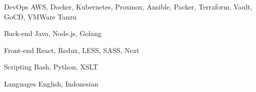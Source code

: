 

\begin{cvskills}

  \cvskill
    {DevOps} %
    {AWS, Docker, Kubernetes, Proxmox, Ansible, Packer, Terraform, Vault, GoCD, VMWare Tanzu} %

  \cvskill
    {Back-end} %
    {Java, Node.js, Golang} %

  \cvskill
    {Front-end} %
    {React, Redux, LESS, SASS, Next} %

  \cvskill
    {Scripting} %
    {Bash, Python, XSLT} %

  \cvskill
    {Languages} %
    {English, Indonesian} %

\end{cvskills}
